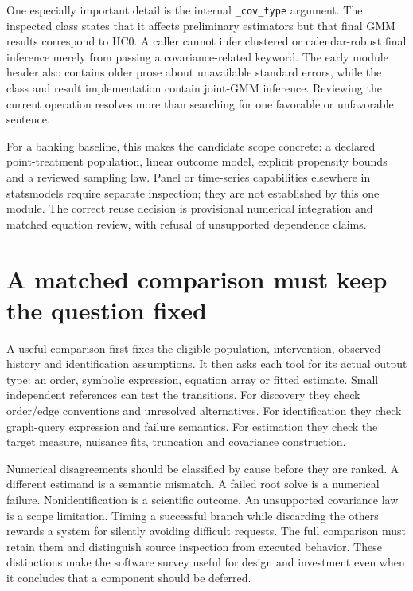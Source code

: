 One especially important detail is the internal \texttt{\_cov\_type} argument.
The inspected class states that it affects preliminary estimators but that final
GMM results correspond to HC0. A caller cannot infer clustered or calendar-robust
final inference merely from passing a covariance-related keyword. The early
module header also contains older prose about unavailable standard errors,
while the class and result implementation contain joint-GMM inference. Reviewing
the current operation resolves more than searching for one favorable or
unfavorable sentence. \cite{v13_sw_statsmodels}

For a banking baseline, this makes the candidate scope concrete: a declared
point-treatment population, linear outcome model, explicit propensity bounds
and a reviewed sampling law. Panel or time-series capabilities elsewhere in
statsmodels require separate inspection; they are not established by this one
module. The correct reuse decision is provisional numerical integration and
matched equation review, with refusal of unsupported dependence claims.

\section{A matched comparison must keep the question fixed}

A useful comparison first fixes the eligible population, intervention, observed
history and identification assumptions. It then asks each tool for its actual
output type: an order, symbolic expression, equation array or fitted estimate.
Small independent references can test the transitions. For discovery they
check order/edge conventions and unresolved alternatives. For identification
they check graph-query expression and failure semantics. For estimation they
check the target measure, nuisance fits, truncation and covariance construction.

Numerical disagreements should be classified by cause before they are ranked.
A different estimand is a semantic mismatch. A failed root solve is a numerical
failure. Nonidentification is a scientific outcome. An unsupported covariance
law is a scope limitation. Timing a successful branch while discarding the
others rewards a system for silently avoiding difficult requests. The full
comparison must retain them and distinguish source inspection from executed
behavior. These distinctions make the software survey useful for design and
investment even when it concludes that a component should be deferred.


